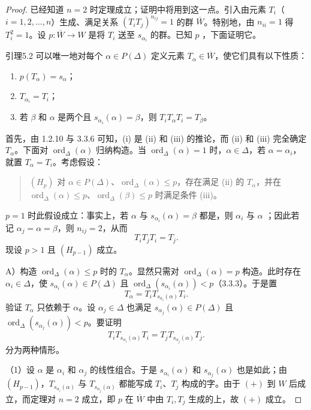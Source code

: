 \begin{proof}
已经知道 $n=2$ 时定理成立；证明中将用到这一点。引入由元素 $T_i$（$i=1,2,\ldots,n$）生成、满足关系 $(T_iT_j)^{n_{ij}}=1$ 的群 $\overline W$。特别地，由 $n_{ii}=1$ 得 $T_i^2=1$。设 $p:\overline W\to W$ 是将 $T_i$ 送至 $s_{\alpha_i}$ 的群。已知 $p$ ，下面证明它。
\begin{SGAresult}{引理}{5.2}
可以唯一地对每个 $\alpha\in P(\Delta)$ 定义元素 $T_\alpha\in\overline W$，使它们具有以下性质：
\begin{enumerate}
\item[(i)] $p(T_\alpha)=s_\alpha$；
\item[(ii)] $T_{\alpha_i}=T_i$；
\item[(iii)] 若 $\beta$ 和 $\alpha$ 是两个且 $s_{\alpha_i}(\alpha)=\beta$，则 $T_iT_\alpha T_i=T_\beta$。
\end{enumerate}
\end{SGAresult}
首先，由 1.2.10 与 3.3.6 可知，(i) 是 (ii) 和 (iii) 的推论，而 (ii) 和 (iii) 完全确定 $T_\alpha$。下面对 $\operatorname{ord}_\Delta(\alpha)$ 归纳构造。当 $\operatorname{ord}_\Delta(\alpha)=1$ 时，$\alpha\in\Delta$，若 $\alpha=\alpha_i$，就置 $T_\alpha=T_i$。考虑假设：
\begin{quote}
$(H_p)$ 对 $\alpha\in P(\Delta)$、$\operatorname{ord}_\Delta(\alpha)\leq p$，存在满足 (ii) 的 $T_\alpha$，并在 $\operatorname{ord}_\Delta(\alpha)\leq p$、$\operatorname{ord}_\Delta(\beta)\leq p$ 时满足条件 (iii)。
\end{quote}
$p=1$ 时此假设成立：事实上，若 $\alpha$ 与 $s_{\alpha_i}(\alpha)=\beta$ 都是，则 $\alpha_i$ 与 $\alpha$ ；因此若记 $\alpha_j=\alpha=\beta$，则 $n_{ij}=2$，从而
\[T_iT_jT_i=T_j.\]
现设 $p>1$ 且 $(H_{p-1})$ 成立。

A）构造 $\operatorname{ord}_\Delta(\alpha)\leq p$ 时的 $T_\alpha$。显然只需对 $\operatorname{ord}_\Delta(\alpha)=p$ 构造。此时存在 $\alpha_i\in\Delta$，使 $s_{\alpha_i}(\alpha)\in P(\Delta)$ 且 $\operatorname{ord}_\Delta(s_{\alpha_i}(\alpha))<p$（3.3.3）。于是置
\[T_\alpha=T_iT_{s_{\alpha_i}(\alpha)}T_i.\tag{$\star$}\]
验证 $T_\alpha$ 只依赖于 $\alpha$。设 $\alpha_j\in\Delta$ 也满足 $s_{\alpha_j}(\alpha)\in P(\Delta)$ 且 $\operatorname{ord}_\Delta(s_{\alpha_j}(\alpha))<p$。要证明
\[T_iT_{s_{\alpha_i}(\alpha)}T_i=T_jT_{s_{\alpha_j}(\alpha)}T_j.\tag{+}\]
分为两种情形。

（1）设 $\alpha$ 是 $\alpha_i$ 和 $\alpha_j$ 的线性组合。于是 $s_{\alpha_i}(\alpha)$ 和 $s_{\alpha_j}(\alpha)$ 也是如此；由 $(H_{p-1})$，$T_{s_{\alpha_i}(\alpha)}$ 与 $T_{s_{\alpha_j}(\alpha)}$ 都能写成 $T_i$、$T_j$ 构成的字。由于 $(+)$ 到 $W$ 后成立，而定理对 $n=2$ 成立，即 $p$ 在 $\overline W$ 中由 $T_i,T_j$ 生成的上，故 $(+)$ 成立。


\end{proof}
